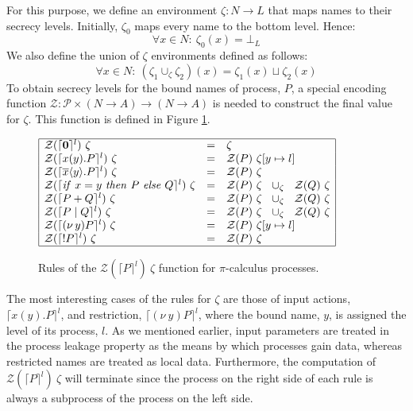 \documentclass[10pt,a4paper,final,oneside,fleqn]{book}
\begin{document}
For this purpose, we define an environment $\zeta: N\to L$ that maps names to their secrecy levels. Initially, $\zeta_{0}$ maps every name to the bottom level.  Hence:
\begin{equation*}
\forall x\in N:~\zeta_0(x)=\bot_L
\end{equation*}
We also define the union of $\zeta$ environments defined as follows:
\begin{equation*}
\forall x\in N:~(\zeta_1\cup_\zeta\zeta_2)(x)=\zeta_1(x)\sqcup\zeta_2(x)
\end{equation*}
To obtain secrecy levels for the bound names of process, $P$, a special encoding function $\mathcal{Z}:\mathcal{P}\times( N\to A)\to( N\to A)$ is needed to construct the final value for $\zeta$. This function is defined in Figure \ref{zeta}.
\begin{figure}[bht]
\begin{center}
$\begin{array}{|lll|}
\hline
\mathcal{Z}(\lceil {\bf 0}\rceil^l)~\zeta&=&\zeta\\
\mathcal{Z}(\lceil x(y).P\rceil^l)~\zeta&=&\mathcal{Z}(P)~\zeta[y\mapsto l]\\
\mathcal{Z}(\lceil \overline{x}\langle y\rangle.P\rceil^l)~\zeta&=&\mathcal{Z}(P)~\zeta\\
\mathcal{Z}(\lceil \mbox{{\itshape if\/} }x=y\mbox{ {\itshape then\/} }P\mbox{ {\itshape else\/} }Q\rceil^l)~\zeta&=&\mathcal{Z}(P)~\zeta~~\cup_\zeta~~\mathcal{Z}(Q)~\zeta\\
\mathcal{Z}(\lceil P+Q\rceil^l)~\zeta&=&\mathcal{Z}(P)~\zeta~~\cup_\zeta~~\mathcal{Z}(Q)~\zeta\\
\mathcal{Z}(\lceil P\mid Q\rceil^l)~\zeta&=&\mathcal{Z}(P)~\zeta~~\cup_\zeta~~\mathcal{Z}(Q)~\zeta\\
\mathcal{Z}(\lceil (\nu~\!y)P\rceil^l)~\zeta&=&\mathcal{Z}(P)~\zeta[y\mapsto l]\\
\mathcal{Z}(\lceil !P\rceil^l)~\zeta&=&\mathcal{Z}(P)~\zeta\\
\hline
\end{array}$
\end{center}
\caption{Rules of the $\mathcal{Z}(\lceil P\rceil^l)~\zeta$ function for $\pi$-calculus processes.\label{zeta}}
\end{figure}
The most interesting cases of the rules for $\zeta$ are those of input actions, $\lceil x(y).P\rceil^l$, and restriction, $\lceil(\nu~\!y)P\rceil^l$, where the bound name, $y$, is assigned the level of its process, $l$. As we mentioned earlier, input parameters are treated in the process leakage property as the means by which processes gain data, whereas restricted names are treated as local data.  Furthermore, the computation of $\mathcal{Z}(\lceil P\rceil^l)~\zeta$ will terminate since the process on the right side of each rule is always a subprocess of the process on the left side.
\end{document}
